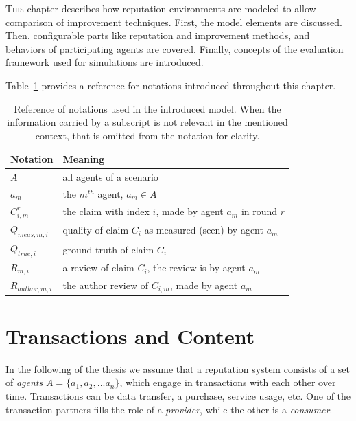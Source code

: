 \documentclass[%
    ]{\PathToTumTemplate/thesis/tum_thesis}
\begin{document}
\lettrine{T}{his} chapter describes how reputation environments are modeled to allow comparison of improvement techniques.
First, the model elements are discussed.
Then, configurable parts like reputation and improvement methods, and behaviors of participating agents are covered.
Finally, concepts of the evaluation framework used for simulations are introduced.

Table~\ref{tab:model_notations} provides a reference for notations introduced throughout this chapter.

\begin{table}[tbp]
\centering
\begin{tabular}{ll}
\toprule
\textbf{Notation}        & \textbf{Meaning} \\ \midrule
$A$ & all agents of a scenario \\
$a_m$ & the $m^{th}$ agent, $a_m\in A$ \\
$C^r_{i,m}$ & the claim with index $i$, made by agent $a_m$ in round $r$\\
$Q_{meas,m,i}$ & quality of claim $C_i$ as measured (seen) by agent $a_m$ \\
$Q_{true,i}$ & ground truth of claim $C_i$ \\
$R_{m,i}$ & a review of claim $C_i$, the review is by agent $a_m$ \\
$R_{author,m,i}$ & the author review of $C_{i,m}$, made by agent $a_m$ \\
\bottomrule
\end{tabular}
\caption{
    Reference of notations used in the introduced model.
    When the information carried by a subscript is not relevant in the mentioned context, that is omitted from the notation for clarity.
}
\label{tab:model_notations}
\end{table}



\section{Transactions and Content}\label{sec:approach_content}
In the following of the thesis we assume that a reputation system consists of a set of \emph{agents} $ A = \{a_1, a_2, ... a_n\} $, which engage in transactions with each other over time.
Transactions can be data transfer, a purchase, service usage, etc.
One of the transaction partners fills the role of a \emph{provider}, while the other is a \emph{consumer}.
\end{document}
